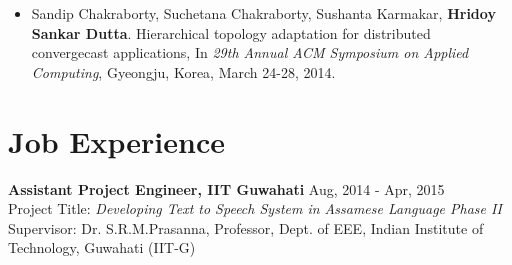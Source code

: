 \documentclass[margin, centered]{res}
\begin{document}
\begin{resume}
\begin{itemize}[leftmargin=*]
\item Sandip Chakraborty, Suchetana Chakraborty, Sushanta Karmakar, \textbf{Hridoy Sankar Dutta}. Hierarchical topology adaptation for distributed convergecast applications, In \textit{29th Annual ACM Symposium on Applied Computing}, Gyeongju, Korea, March 24-28, 2014.
\end{itemize}

\section{Job Experience}
\textbf{Assistant Project Engineer, IIT Guwahati} \hfill Aug, 2014 - Apr, 2015 \\
Project Title: \textit{Developing Text to Speech System in Assamese Language Phase II} \\
Supervisor: Dr. S.R.M.Prasanna, Professor, Dept. of EEE, Indian Institute of Technology, Guwahati (IIT-G)

\end{resume}
\end{document}
